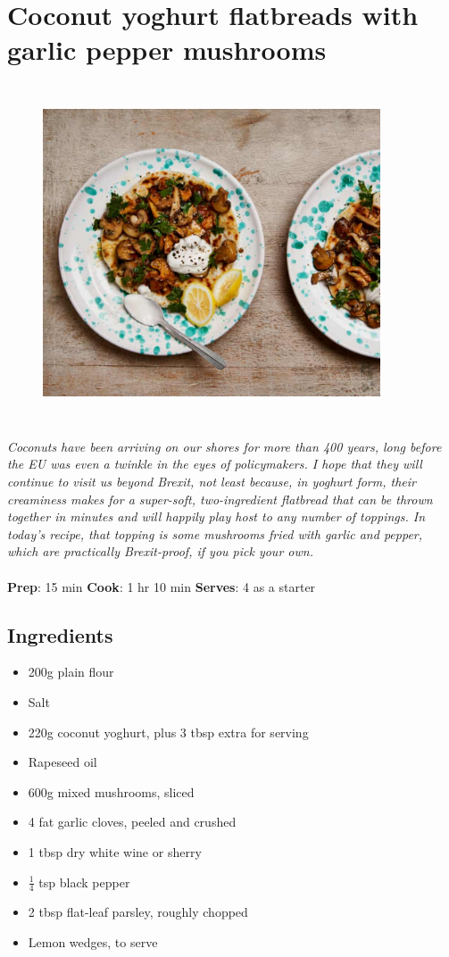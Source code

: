 \documentclass{book}
\begin{document}
\section{Coconut yoghurt flatbreads with garlic pepper mushrooms}
\begin{figure}
\centering\includegraphics[width=10cm,height=10cm,keepaspectratio]{Recipe_Pictures/Coconut_yoghurt_flatbreads_with_garlic_pepper_mushrooms.png}
\end{figure}
\emph{Coconuts have been arriving on our shores for more than 400 years, long before the EU was even a twinkle in the eyes of policymakers. I hope that they will continue to visit us beyond Brexit, not least because, in yoghurt form, their creaminess makes for a super-soft, two-ingredient flatbread that can be thrown together in minutes and will happily play host to any number of toppings. In today’s recipe, that topping is some mushrooms fried with garlic and pepper, which are practically Brexit-proof, if you pick your own.}\\\\ 
\textbf{Prep}: 15 min
\textbf{Cook}: 1 hr 10 min
\textbf{Serves}: 4 as a starter
\subsection*{Ingredients}
\begin{itemize}
\item 200g plain flour 
\item Salt 
\item 220g coconut yoghurt, plus 3 tbsp extra for serving
\item Rapeseed oil 
\item 600g mixed mushrooms, sliced 
\item 4 fat garlic cloves, peeled and crushed 
\item 1 tbsp dry white wine or sherry 
\item $\frac{1}{4}$ tsp black pepper 
\item 2 tbsp flat-leaf parsley, roughly chopped 
\item Lemon wedges, to serve
\end{itemize}
\end{document}
